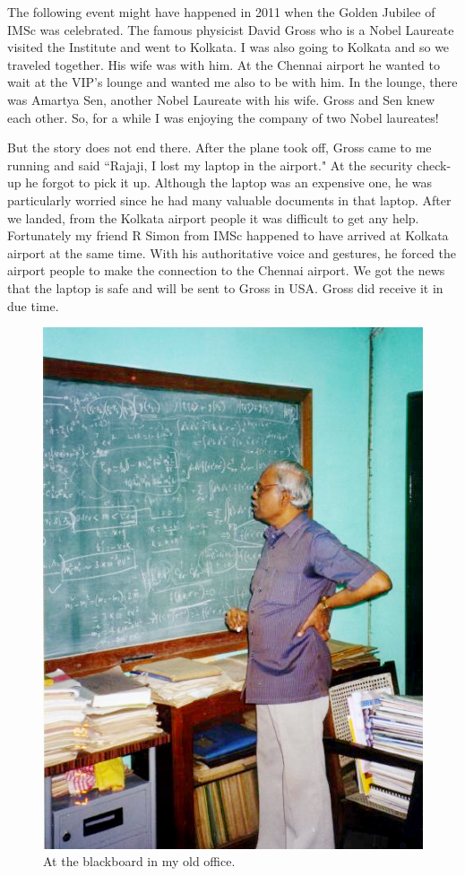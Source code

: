 The following event might have happened in 2011 when the Golden Jubilee 
of IMSc was celebrated. The famous physicist David Gross who is a Nobel 
Laureate visited the Institute and went to Kolkata. I was also going to 
Kolkata and so we traveled together. His wife was with him. At the 
Chennai airport he wanted to wait at the VIP's lounge and wanted me also 
to be with him. In the lounge, there was Amartya Sen, another Nobel 
Laureate with his wife. Gross and Sen knew each other. So, for a while I 
was enjoying the company of two Nobel laureates!

But the story does not end there. After the plane took off, Gross came 
to me running and said ``Rajaji, I lost my laptop in the airport." At the 
security check-up he forgot to pick it up. Although the laptop was an 
expensive one, he was particularly worried since he had many valuable 
documents in that laptop. After we landed, from the Kolkata airport 
people it was difficult to get any help. Fortunately my friend R Simon 
from IMSc happened to have arrived at Kolkata airport at the same time. 
With his authoritative voice and gestures, he forced the airport people 
to make the connection to the Chennai airport. We got the news that the 
laptop is safe and will be sent to Gross in USA. Gross did receive it in 
due time.
\medskip

\begin{figure}[h]
\centering
\includegraphics[width=.6\textwidth]{images/rajaji1.jpg}
\caption{At the blackboard in my old office.}
\end{figure}

